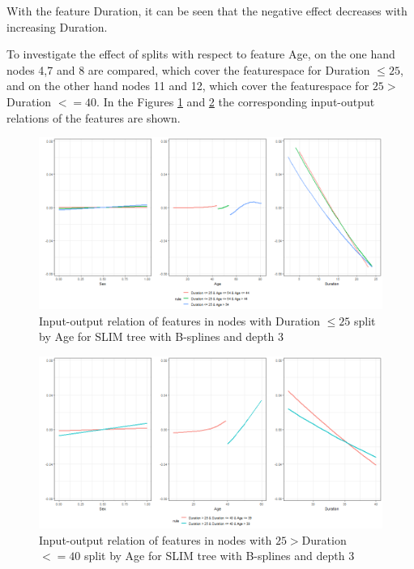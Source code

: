 With the feature Duration, it can be seen that the negative effect decreases with increasing Duration.

To investigate the effect of splits with respect to feature Age, on the one hand nodes 4,7 and 8 are compared, which cover the featurespace for Duration $\leq 25$, and on the other hand nodes 11 and 12, which cover the featurespace for $25 > $Duration $<= 40$. In the Figures \ref{fig:ins_k2204_effects_age_low_duration} and \ref{fig:ins_k2204_effects_age_medium_duration} the corresponding input-output relations of the features are shown.

\begin{figure}[!htb]
    \centering    
    \includegraphics[width = 16cm]{Figures/insurance_use_case/k2204_BPV/effects_age_low_duration.png}
    \caption{Input-output relation of features in nodes with Duration $\leq 25$ split by Age for SLIM tree with B-splines and depth 3}
    \label{fig:ins_k2204_effects_age_low_duration}
\end{figure}

\begin{figure}[!htb]
    \centering    
    \includegraphics[width = 16cm]{Figures/insurance_use_case/k2204_BPV/effects_age_medium_duration.png}
    \caption{Input-output relation of features in nodes with $25 > $Duration $<= 40$ split by Age for SLIM tree with B-splines and depth 3}
    \label{fig:ins_k2204_effects_age_medium_duration}
\end{figure}

